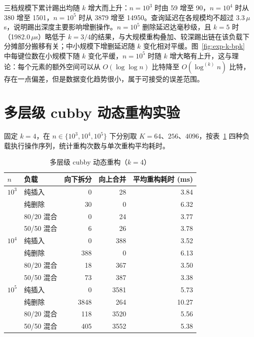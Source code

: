 三档规模下累计踢出均随 \(k\) 增大而上升：\(n=10^3\) 时由 59 增至 90，\(n=10^4\) 时从 380 增至 1501，\(n=10^5\) 时从 3879 增至 14950。查询延迟在各规模均不超过 3.3\,$\mu$s，说明踢出深度主要影响增删操作。\(n=10^5\) 删除延迟达毫秒级，且 \(k=5\) 时（1982.0\,$\mu$s）略低于 \(k=3/4\)的结果，与大规模重构叠加、较深踢出链在该负载下分摊部分搬移有关；中小规模下增删延迟随 \(k\) 变化相对平缓\cite{bender2022otsh}。图~\ref{fig:exp-k-bpk} 中每键位数在小规模下随 \(k\) 变化平缓，\(n=10^5\) 时随 \(k\) 增大略有上升，这与理论：每个元素的额外空间可以从 \(O(\log\log n)\) 比特降至 \(O(\log^{(k)}n)\) 比特，存在一点偏差，但是数据变化趋势很小，属于可接受的误差范围。

\section{多层级 cubby 动态重构实验}

固定 \(k=4\)，在 \(n\in\{10^3,10^4,10^5\}\) 下分别取 \(K=64\)、\(256\)、\(4096\)，按表~\ref{tab:exp-tier-fixed} 四种负载执行操作序列，统计重构次数与单次重构平均耗时。

\begin{table}[htbp]
  \centering
  \caption{多层级 cubby 动态重构（\(k=4\)）}
  \label{tab:exp-tier-fixed}
  \footnotesize
  \begin{tabular}{llrrr}
    \toprule
    $n$ & 负载 & 向下拆分 & 向上合并 & 平均重构耗时 (ms) \\
    \midrule
    $10^3$  & 纯插入    & 0  & 28  & 3.84 \\
            & 纯删除    & 30 & 0   & 6.32 \\
            & 80/20 混合 & 0  & 24  & 3.77 \\
            & 50/50 混合 & 6  & 26  & 3.78 \\
    \midrule
    $10^4$  & 纯插入    & 0   & 388 & 3.52 \\
            & 纯删除    & 388 & 0   & 6.13 \\
            & 80/20 混合 & 18  & 367 & 3.50 \\
            & 50/50 混合 & 73  & 387 & 3.38 \\
    \midrule
    $10^5$  & 纯插入    & 0    & 3581 & 5.73 \\
            & 纯删除    & 3848 & 264  & 10.27 \\
            & 80/20 混合 & 118  & 3520 & 5.56 \\
            & 50/50 混合 & 405  & 3552 & 5.38 \\
    \bottomrule
  \end{tabular}
\end{table}

